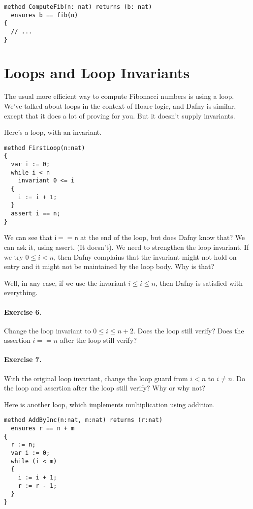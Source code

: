 \documentclass[11pt]{article}
\begin{document}
\begin{lstlisting}[language=dafny]
method ComputeFib(n: nat) returns (b: nat)
  ensures b == fib(n)
{
  // ...
}
\end{lstlisting}

\section*{Loops and Loop Invariants}
The usual more efficient way to compute Fibonacci numbers is using a loop. We've talked
about loops in the context of Hoare logic, and Dafny is similar, except that it does a lot of
proving for you. But it doesn't supply invariants.

Here's a loop, with an invariant.
\begin{lstlisting}[language=dafny]
method FirstLoop(n:nat)
{
  var i := 0;
  while i < n
    invariant 0 <= i
  {
    i := i + 1;
  }
  assert i == n;
}
\end{lstlisting}
We can see that $\mathsf{i == n}$ at the end of the loop, but does Dafny know that? We can ask it, using
\textsf{assert}. (It doesn't). We need to strengthen the loop invariant. If we try $0 \leq i < n$, then
Dafny complains that the invariant might not hold on entry and it might not be maintained by the loop body.
Why is that?

Well, in any case, if we use the invariant $i \leq i \leq n$, then Dafny is satisfied with everything.

\paragraph{Exercise 6.} Change the loop invariant to $0 \leq i \leq n + 2$. Does the loop still verify?
Does the assertion $i == n$ after the loop still verify?

\paragraph{Exercise 7.} With the original loop invariant, change the loop guard from $i < n$ to
$i \neq n$. Do the loop and assertion after the loop still verify? Why or why not?

Here is another loop, which implements multiplication using addition.
\begin{lstlisting}[language=dafny]
method AddByInc(n:nat, m:nat) returns (r:nat)
  ensures r == n + m
{
  r := n;
  var i := 0;
  while (i < m)
  {
    i := i + 1;
    r := r - 1;
  }
}
\end{lstlisting}
\end{document}
